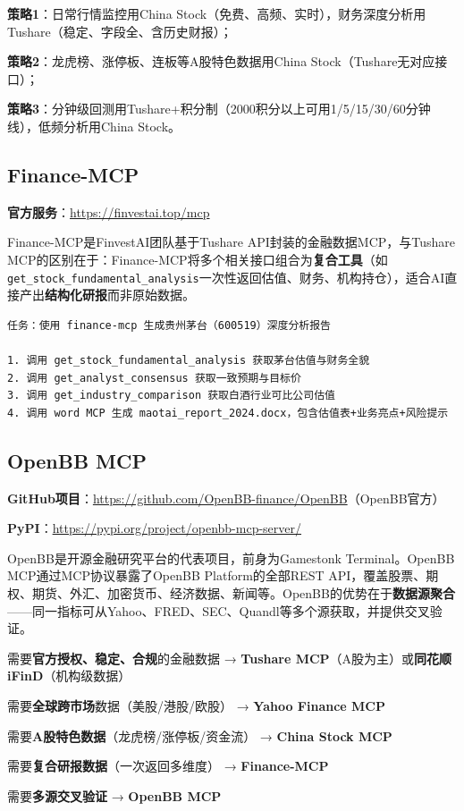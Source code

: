 \begin{notebox}
\textbf{策略1}：日常行情监控用China Stock（免费、高频、实时），财务深度分析用Tushare（稳定、字段全、含历史财报）；

\textbf{策略2}：龙虎榜、涨停板、连板等A股特色数据用China Stock（Tushare无对应接口）；

\textbf{策略3}：分钟级回测用Tushare+积分制（2000积分以上可用1/5/15/30/60分钟线），低频分析用China Stock。
\end{notebox}

\subsection{Finance-MCP}

\textbf{官方服务}：\url{https://finvestai.top/mcp}

Finance-MCP是FinvestAI团队基于Tushare API封装的金融数据MCP，与Tushare MCP的区别在于：Finance-MCP将多个相关接口组合为\textbf{复合工具}（如\texttt{get\_stock\_fundamental\_analysis}一次性返回估值、财务、机构持仓），适合AI直接产出\textbf{结构化研报}而非原始数据。

\begin{lstlisting}
任务：使用 finance-mcp 生成贵州茅台（600519）深度分析报告

1. 调用 get_stock_fundamental_analysis 获取茅台估值与财务全貌
2. 调用 get_analyst_consensus 获取一致预期与目标价
3. 调用 get_industry_comparison 获取白酒行业可比公司估值
4. 调用 word MCP 生成 maotai_report_2024.docx，包含估值表+业务亮点+风险提示
\end{lstlisting}

\subsection{OpenBB MCP}

\textbf{GitHub项目}：\url{https://github.com/OpenBB-finance/OpenBB}（OpenBB官方）

\textbf{PyPI}：\url{https://pypi.org/project/openbb-mcp-server/}

OpenBB是开源金融研究平台的代表项目，前身为Gamestonk Terminal。OpenBB MCP通过MCP协议暴露了OpenBB Platform的全部REST API，覆盖股票、期权、期货、外汇、加密货币、经济数据、新闻等。OpenBB的优势在于\textbf{数据源聚合}——同一指标可从Yahoo、FRED、SEC、Quandl等多个源获取，并提供交叉验证。

\begin{notebox}[金融数据MCP的选型决策树]
需要\textbf{官方授权、稳定、合规}的金融数据 → \textbf{Tushare MCP}（A股为主）或\textbf{同花顺iFinD}（机构级数据）

需要\textbf{全球跨市场}数据（美股/港股/欧股） → \textbf{Yahoo Finance MCP}

需要\textbf{A股特色数据}（龙虎榜/涨停板/资金流） → \textbf{China Stock MCP}

需要\textbf{复合研报数据}（一次返回多维度） → \textbf{Finance-MCP}

需要\textbf{多源交叉验证} → \textbf{OpenBB MCP}
\end{notebox}

